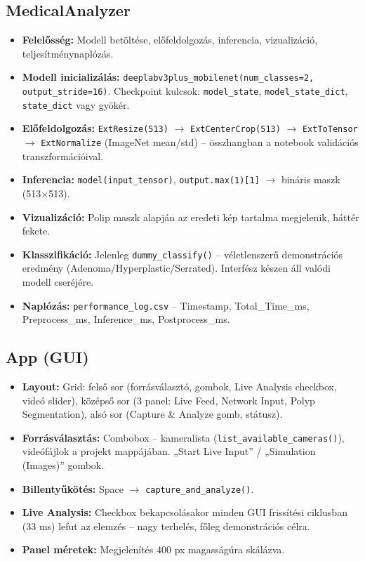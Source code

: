 \subsection{MedicalAnalyzer}
\begin{itemize}
    \item \textbf{Felelősség:} Modell betöltése, előfeldolgozás, inferencia, vizualizáció, teljesítménynaplózás.
    \item \textbf{Modell inicializálás:} \texttt{deeplabv3plus\_mobilenet(num\_classes=2, output\_stride=16)}. Checkpoint kulcsok: \texttt{model\_state}, \texttt{model\_state\_dict}, \texttt{state\_dict} vagy gyökér.
    \item \textbf{Előfeldolgozás:} \texttt{ExtResize(513)} $\rightarrow$ \texttt{ExtCenterCrop(513)} $\rightarrow$ \texttt{ExtToTensor} $\rightarrow$ \texttt{ExtNormalize} (ImageNet mean/std) – összhangban a notebook validációs transzformációival.
    \item \textbf{Inferencia:} \texttt{model(input\_tensor)}, \texttt{output.max(1)[1]} $\rightarrow$ bináris maszk (513×513).
    \item \textbf{Vizualizáció:} Polip maszk alapján az eredeti kép tartalma megjelenik, háttér fekete.
    \item \textbf{Klasszifikáció:} Jelenleg \texttt{dummy\_classify()} – véletlenszerű demonstrációs eredmény (Adenoma/Hyperplastic/Serrated). Interfész készen áll valódi modell cseréjére.
    \item \textbf{Naplózás:} \texttt{performance\_log.csv} – Timestamp, Total\_Time\_ms, Preprocess\_ms, Inference\_ms, Postprocess\_ms.
\end{itemize}

\subsection{App (GUI)}
\begin{itemize}
    \item \textbf{Layout:} Grid: felső sor (forrásválasztó, gombok, Live Analysis checkbox, videó slider), középső sor (3 panel: Live Feed, Network Input, Polyp Segmentation), alsó sor (Capture \& Analyze gomb, státusz).
    \item \textbf{Forrásválasztás:} Combobox – kameralista (\texttt{list\_available\_cameras()}), videófájlok a projekt mappájában. „Start Live Input” / „Simulation (Images)” gombok.
    \item \textbf{Billentyűkötés:} Space $\rightarrow$ \texttt{capture\_and\_analyze()}.
    \item \textbf{Live Analysis:} Checkbox bekapcsolásakor minden GUI frissítési ciklusban (33 ms) lefut az elemzés – nagy terhelés, főleg demonstrációs célra.
    \item \textbf{Panel méretek:} Megjelenítés 400 px magasságúra skálázva.
\end{itemize}

